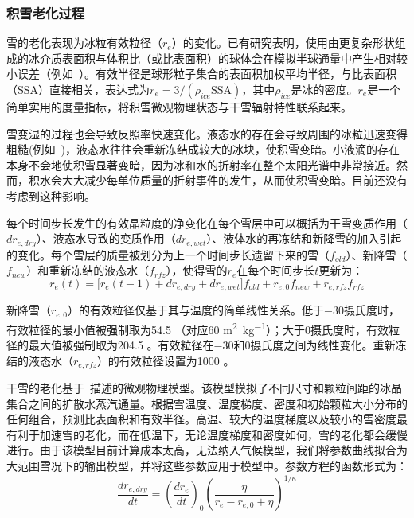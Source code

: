 \subsubsection{积雪老化过程}\label{积雪老化}

雪的老化表现为冰粒有效粒径（$r_e$）的变化。已有研究表明，使用由更复杂形状组成的冰介质表面积与体积比（或比表面积）的球体会在模拟半球通量中产生相对较小误差（例如~\citet{grenfell1999RepresentationNonsphericalIce}）。有效半径是球形粒子集合的表面积加权平均半径，与比表面积（SSA）直接相关，表达式为$r_e=3/(\rho_{ice}\text{SSA})$，其中$\rho_{ice}$是冰的密度。$r_e$是一个简单实用的度量指标，将积雪微观物理状态与干雪辐射特性联系起来。

雪变湿的过程也会导致反照率快速变化。液态水的存在会导致周围的冰粒迅速变得粗糙(例如~\citet{brun1989InvestigationWetSnowMetamorphism})，液态水往往会重新冻结成较大的冰块，使积雪变暗。小液滴的存在本身不会地使积雪显著变暗，因为冰和水的折射率在整个太阳光谱中非常接近。然而，积水会大大减少每单位质量的折射事件的发生，从而使积雪变暗。目前还没有考虑到这种影响。

每个时间步长发生的有效晶粒度的净变化在每个雪层中可以概括为干雪变质作用（$dr_{e,dry}$）、液态水导致的变质作用（$dr_{e,wet}$）、液体水的再冻结和新降雪的加入引起的变化。每个雪层的质量被划分为上一个时间步长遗留下来的雪（$f_{old}$）、新降雪（$f_{new}$）和重新冻结的液态水（$f_{rfz}$），使得雪的$r_e$在每个时间步长${t}$更新为：
\begin{equation}
r_{e}(t) = \lbrack r_{e}(t - 1) + {dr}_{e,dry} + {dr}_{e,wet}\rbrack f_{old} + r_{e,0}f_{new} + r_{e,rfz}f_{rfz}
\end{equation}

新降雪（$r_{e,0}$）的有效粒径仅基于其与温度的简单线性关系。低于$-30$摄氏度时，有效粒径的最小值被强制取为54.5 \unit{}（对应60 \unit{m^{2}.kg^{-1}}）；大于0摄氏度时，有效粒径的最大值被强制取为204.5 \unit{}。有效粒径在$-30$和0摄氏度之间为线性变化。重新冻结的液态水（$r_{e,rfz}$）的有效粒径设置为1000 \unit{}。

干雪的老化基于~\citet{flanner2006LinkingSnowpackMicrophysics}描述的微观物理模型。该模型模拟了不同尺寸和颗粒间距的冰晶集合之间的扩散水蒸汽通量。根据雪温度、温度梯度、密度和初始颗粒大小分布的任何组合，预测比表面积和有效半径。高温、较大的温度梯度以及较小的雪密度最有利于加速雪的老化，而在低温下，无论温度梯度和密度如何，雪的老化都会缓慢进行。由于该模型目前计算成本太高，无法纳入气候模型，我们将参数曲线拟合为大范围雪况下的输出模型，并将这些参数应用于模型中。参数方程的函数形式为：
\begin{equation}
\frac{{dr}_{e,dry}}{dt} = \left( \frac{{dr}_{e}}{dt} \right)_{0}\left( \frac{\eta}{r_{e} - r_{e,0} + \eta} \right)^{1/\kappa}
\end{equation}

